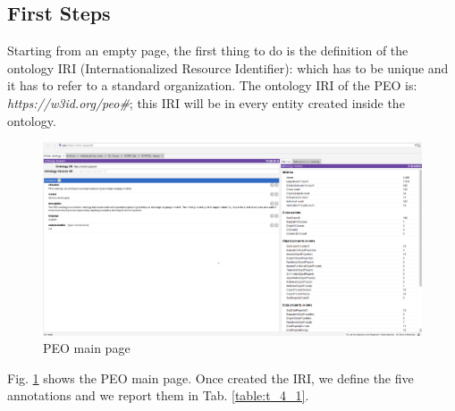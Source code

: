 \subsection{First Steps}
\label{subsection:4_3_2_encoding}
Starting from an empty page, the first thing to do is the definition of the ontology IRI (Internationalized Resource Identifier): which has to be unique and it has to refer to a standard organization.
The ontology IRI of the PEO is: \textit{https://w3id.org/peo\#}; this IRI will be in every entity created inside the ontology.
\begin{figure}[H]
    \centering
    \includegraphics[width=0.8\linewidth]{Figures/fig_29.png}
    \caption{PEO main page}
    \label{fig:29}
\end{figure}
Fig. \ref{fig:29} shows the PEO main page.
Once created the IRI, we define the five annotations and we report them in Tab. \ref{table:t_4_1}. %

